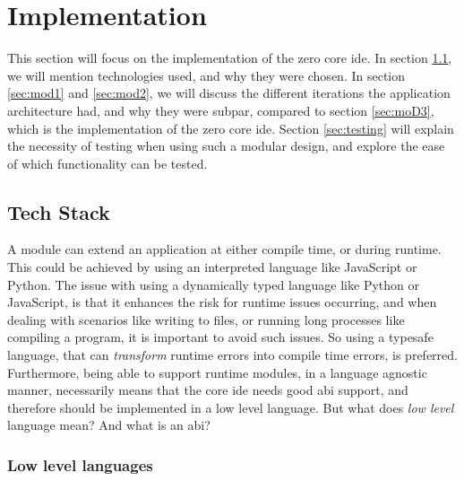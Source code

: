 \chapter{Implementation} \label{cha:impl}

This section will focus on the implementation of the zero core \gls*{ide}. In
section \ref{sec:stack}, we will mention technologies used, and why they were
chosen. In section \ref{sec:mod1} and \ref{sec:mod2}, we will discuss the
different iterations the application architecture had, and why they were subpar,
compared to section \ref{sec:moD3}, which is the implementation of the zero core
\gls*{ide}. Section \ref{sec:testing} will explain the necessity of testing when
using such a modular design, and explore the ease of which functionality can be
tested.

\section{Tech Stack} \label{sec:stack}

A module can extend an application at either compile time, or during runtime.
This could be achieved by using an interpreted language like JavaScript or
Python. The issue with using a dynamically typed language like Python or
JavaScript, is that it enhances the risk for runtime issues occurring, and when
dealing with scenarios like writing to files, or running long processes like
compiling a program, it is important to avoid such issues. So using a typesafe
language, that can \textit{transform} runtime errors into compile time errors,
is preferred. Furthermore, being able to support runtime modules, in a language
agnostic manner, necessarily means that the core \gls*{ide} needs good
\gls*{abi} support, and therefore should be implemented in a low level language.
But what does \textit{low level} language mean? And what is an \gls*{abi}?

\subsection{Low level languages}

